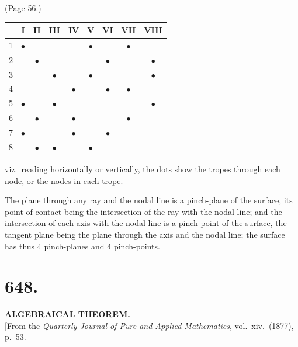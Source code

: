 \documentclass[11pt,a4paper]{article}
\begin{document}
\bigskip

\noindent (Page 56.)
\begin{center}
\begin{tabular}{c|cccccccc}
 & I & II & III & IV & V & VI & VII & VIII \\
\hline
1 & $\bullet$ & & & & $\bullet$ & & $\bullet$ & \\
2 & & $\bullet$ & & & & $\bullet$ & & $\bullet$ \\
3 & & & $\bullet$ & & $\bullet$ & & & $\bullet$ \\
4 & & & & $\bullet$ & & $\bullet$ & $\bullet$ & \\
5 & $\bullet$ & & $\bullet$ & & & & & $\bullet$ \\
6 & & $\bullet$ & & $\bullet$ & & & $\bullet$ & \\
7 & $\bullet$ & & & $\bullet$ & & $\bullet$ & & \\
8 & & $\bullet$ & $\bullet$ & & $\bullet$ & & & \\
\end{tabular}
\end{center}

\noindent viz.\ reading horizontally or vertically, the dots show the tropes through each node, or the nodes in each trope.

The plane through any ray and the nodal line is a pinch-plane of the surface, its point of contact being the intersection of the ray with the nodal line; and the intersection of each axis with the nodal line is a pinch-point of the surface, the tangent plane being the plane through the axis and the nodal line; the surface has thus $4$ pinch-planes and $4$ pinch-points.

\bigskip


\section*{648.}

\begin{center}
\textbf{ALGEBRAICAL THEOREM.}\\[1em]
[From the \textit{Quarterly Journal of Pure and Applied Mathematics}, vol.~xiv.\ (1877), p.~53.]
\end{center}

\medskip
\end{document}
